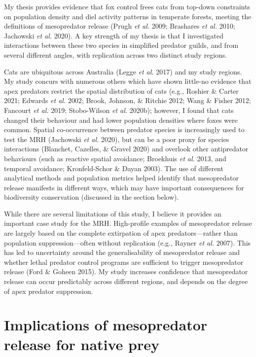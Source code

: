 \documentclass[11pt,a4paper,titlepage,twoside,openright]{style/unimelbthesis}
\begin{document}
\begin{mainmatter}
My thesis provides evidence that fox control frees cats from top-down constraints on population density and diel activity patterns in temperate forests, meeting the definitions of mesopredator release (Prugh \emph{et al.} 2009; Brashares \emph{et al.} 2010; Jachowski \emph{et al.} 2020). A key strength of my thesis is that I investigated interactions between these two species in simplified predator guilds, and from several different angles, with replication across two distinct study regions.

Cats are ubiquitous across Australia (Legge \emph{et al.} 2017) and my study regions. My study concurs with numerous others which have shown little-no evidence that apex predators restrict the spatial distribution of cats (e.g., Roshier \& Carter 2021; Edwards \emph{et al.} 2002; Brook, Johnson, \& Ritchie 2012; Wang \& Fisher 2012; Fancourt \emph{et al.} 2019; Stobo-Wilson \emph{et al.} 2020b); however, I found that cats changed their behaviour and had lower population densities where foxes were common. Spatial co-occurrence between predator species is increasingly used to test the MRH (Jachowski \emph{et al.} 2020), but can be a poor proxy for species interactions (Blanchet, Cazelles, \& Gravel 2020) and overlook other antipredator behaviours (such as reactive spatial avoidance; Broekhuis \emph{et al.} 2013, and temporal avoidance; Kronfeld-Schor \& Dayan 2003). The use of different analytical methods and population metrics helped identify that mesopredator release manifests in different ways, which may have important consequences for biodiversity conservation (discussed in the section below).

While there are several limitations of this study, I believe it provides an important case study for the MRH. High-profile examples of mesopredator release are largely based on the complete extirpation of apex predators---rather than population suppression---often without replication (e.g., Rayner \emph{et al.} 2007). This has led to uncertainty around the generalisability of mesopredator release and whether lethal predator control programs are sufficient to trigger mesopredator release (Ford \& Goheen 2015). My study increases confidence that mesopredator release can occur predictably across different regions, and depends on the degree of apex predator suppression.

\hypertarget{implications-of-mesopredator-release-for-native-prey}{%
\section{Implications of mesopredator release for native prey}\label{implications-of-mesopredator-release-for-native-prey}}


\end{mainmatter}
\end{document}
